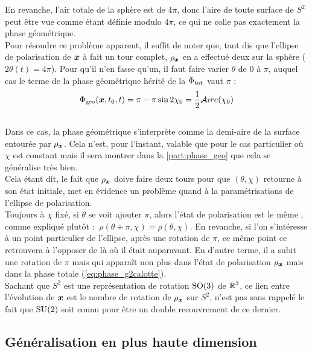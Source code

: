 En revanche, l'air totale de la sphère est de $4\pi$, donc l'aire de toute surface de $S^2$ peut être vue comme étant définie modulo $4\pi$, ce qui ne colle pas exactement la phase géométrique.
\\
Pour résoudre ce problème apparent, il suffit de noter que, tant dis que l’ellipse de polarisation de $\boldsymbol{x}$ à fait un tour complet, 
$\rho_{\boldsymbol{x}}$ en a effectué deux sur la sphère ($2\theta(t) = 4\pi$).
Pour qu'il n'en fasse qu'un, il faut faire varier $\theta$ de 0 à $\pi$, auquel cas le terme de la phase géométrique hérité de la $\Phi_{\text{\normalfont tot}}$ vaut $\pi$ :
\begin{equation} \label{eq:phase_g2calotte}
	\Phi_{\text{\normalfont geo}}(\boldsymbol{x}, t_0, t) = \pi - \pi\sin 2\chi_0 = \frac{1}{2}\mathcal{A}ire(\chi_0)
\end{equation}
\\
Dans ce cas, la phase géométrique s'interprète comme la demi-aire de la surface entourée par $\rho_{\boldsymbol{x}}$. Cela n'est, pour l'instant, valable que pour le cas particulier où $\chi$ est constant mais il sera montrer dans la \cref{part:phase_geo} que cela se généralise très bien.
\\

Cela étant dit, le fait que $\rho_{\boldsymbol{x}}$ doive faire deux tours pour que $(\theta,\chi)$ retourne à son état initiale, met en évidence un problème quand à la paramétrisations de l'ellipse de polarisation.
\\
Toujours à $\chi$ fixé, si $\theta$ se voit ajouter $\pi$, alors l'état de polarisation est le même , comme expliqué plutôt : $\ \rho(\theta+\pi,\chi) = \rho(\theta, \chi)$.
En revanche, si l'on s'intéresse à un point particulier de l'ellipse, après une rotation de $\pi$, ce même point ce retrouvera à l'opposer de là où il était auparavant. 
En d'autre terme, il a subit une rotation de $\pi$ mais qui apparaît non plus dans l'état de polarisation $\rho_{\boldsymbol{x}}$ mais dans la phase totale (\cref{eq:phase_g2calotte}).
\\
Sachant que $S^2$ est une représentation de rotation $\text{\normalfont SO}(3)$ de $\mathbb{R}^3$, ce lien entre l'évolution de $\boldsymbol{x}$ est le nombre de rotation de $\rho_{\boldsymbol{x}}$ sur $S^2$, n'est pas sans rappelé le fait que $\text{\normalfont SU}(2)$ soit connu pour être un double recouvrement de ce dernier.
\\




\subsection{\todo Généralisation en plus haute dimension} \label{subsec:aller_plus_loin}

